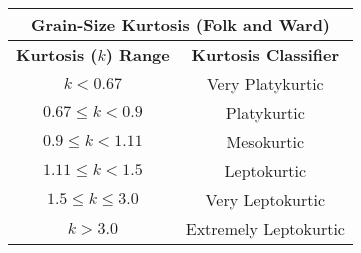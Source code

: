 \documentclass[10pt]{article}
\begin{document}
\begin{center}
\begin{tabular}{ c c  }
\multicolumn{2}{c}{\textbf{Grain-Size Kurtosis (Folk and Ward) }} \\
\hline
\textbf{Kurtosis ($k$) Range} & \textbf{Kurtosis Classifier}  \\
\hline
$ k  < 0.67  $               &  Very Platykurtic   \\ 
$0.67 \le k < 0.9 $    &  Platykurtic   \\  
$0.9 \le k < 1.11 $   &  Mesokurtic  \\     
$1.11 \le k < 1.5 $    & Leptokurtic    \\   
$1.5  \le  k \le  3.0 $    & Very Leptokurtic  \\
$k > 3.0 $    & Extremely Leptokurtic  \\
\end{tabular}
\end{center}
\end{document}
